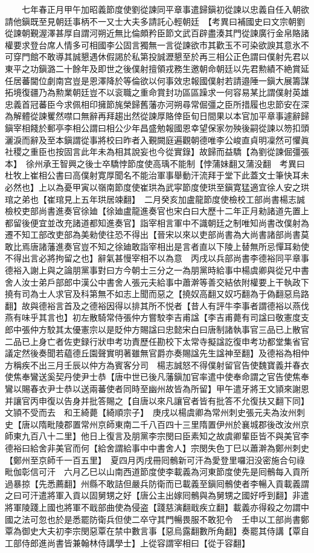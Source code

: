 　　七年春正月甲午加昭義節度使劉從諫同平章事遣歸鎭初從諫以忠義自任入朝欲請他鎭既至見朝廷事柄不一又士大夫多請託心輕朝廷　【考異曰補國史曰文宗朝劉從諫朝覲渥澤甚厚自謂河朔近無比倫頗矜臣節文武百辟盡湊其門從諫廣行金帛賂諸權要求登台席人情多可相國李公固言獨無一言從諫欲市其歡玉不可染欲諛其意氷不可穿門館不敢導其誠懇遇休假謁於私第投誠瀝懇至於再三相公正色謂曰僕射先君以東平之功鎭潞二十餘年及即世之後僕射擅領戎務生邀朝命朝廷以先君勲績不絶賞延任居蕃閫位劇南宫豈是恩澤降於等倫欲以何事效忠報國僕射若請邉陲一鎭大展籌謀拓境復疆乃為勲業朝廷豈不以衮職之重命賞封功區區躁求一何容易某比謂僕射英雄忠義首冠蕃臣今求佩相印擁節旄榮歸舊藩亦河朔尋常倔彊之臣所措履也忠節安在深為解體從諫矍然噤口無辭再拜趨出然從諫厚賂倖臣旬日間果以本官加平章事遽辭歸鎭宰相餞於郵亭李相公謂曰相公少年昌盛勉報國恩幸望保家勿殃後嗣從諫以笏扣頭灑淚而辭及至本鎭謂從事將校曰昨者入覲闕庭遍觀朝德唯李公峻直貞明凜然可懼眞社稷之重臣也按固言此年未為相其說妄也今從實錄】故歸而益驕【為劉從諫倔彊張本】　徐州承王智興之後士卒驕悖節度使高瑀不能制【悖蒲妹翻又蒲没翻　考異曰杜牧上崔相公書曰高僕射寛厚聞名不能治軍事舉動汗流拜于堂下此蓋文士筆快耳未必然也】上以為憂甲寅以嶺南節度使崔珙為武寜節度使珙至鎭寛猛適宜徐人安之珙琯之弟也【崔琯見上五年珙居竦翻】　二月癸亥加盧龍節度使檢校工部尚書楊志誠檢校吏部尚書進奏官徐廸【徐廸盧龍進奏官也宋白曰大歷十二年正月勑諸道先置上都留後便宜並改充諸道都知進奏官】詣宰相言軍中不識朝廷之制唯知尚書改僕射為遷不知工部改吏部為美勑使往恐不得出【晉宋以來以吏部尚書為大尚書諸部尚書莫敢比焉唐諸藩進奏官豈不知之徐廸敢詣宰相出是言者直以下陵上替無所忌憚耳勑使不得出言必將拘留之也】辭氣甚慢宰相不以為意　丙戌以兵部尚書李德裕同平章事德裕入謝上與之論朋黨事對曰方今朝士三分之一為朋黨時給事中楊虞卿與從兄中書舍人汝士弟戶部郎中漢公中書舍人張元夫給事中蕭澣等善交結依附權要上干執政下撓有司為士人求官及科第無不如志上聞而惡之【撓奴高翻又奴巧翻為于偽翻惡烏路翻】故與德裕言首及之德裕因得以排其所不悦者【昔人有評牛李事者謂德裕以燕伐燕有味乎其言也】初左散騎常侍張仲方嘗駮李吉甫諡【李吉甫薨有司諡曰敬憲度支郎中張仲方駮其太優憲宗以是貶仲方賜諡曰忠懿宋白曰唐制諸執事官三品已上散官二品已上身亡者佐吏録行狀申考功責歷任勘校下太常寺擬諡訖復申考功都堂集省官議定然後奏聞若藴德丘園聲實明著雖無官爵亦奏賜諡先生諡神至翻】及德裕為相仲方稱疾不出三月壬辰以仲方為賓客分司　楊志誠怒不得僕射留官告使魏寶義并春衣使焦奉鸞送奚契丹使尹士恭【唐中世已後凡藩鎭加官率遣中使奉命謂之官告使焦奉鸞以賜春衣尹士恭以送兩蕃使者同時至幽州故皆為所留】甲午遣牙將王文頴來謝恩并讓官丙申復以告身并批答賜之【自唐以來凡讓官者皆有批答不允復扶又翻下同】文頴不受而去　和王綺薨【綺順宗子】　庚戌以楊虞卿為常州刺史張元夫為汝州刺史【唐以隋毗陵郡置常州京師東南二千八百四十三里隋置伊州於襄城郡後改汝州京師東九百八十二里】他日上復言及朋黨李宗閔曰臣素知之故虞卿輩臣皆不與美官李德裕曰給舍非美官而何【給舍謂給事中中書舍人】宗閔失色丁巳以蕭澣為鄭州刺史【鄭州至京師千一百五里】　夏四月丙戌冊囘鶻新可汗為愛登里囉汨没密施合句祿毗伽彰信可汗　六月乙巳以山南西道節度使李載義為河東節度使先是囘鶻每入貢所過暴掠【先悉薦翻】州縣不敢詰但嚴兵防衛而已載義至鎭囘鶻使者李暢入貢載義謂之曰可汗遣將軍入貢以固舅甥之好【唐公主出嫁囘鶻與為舅甥之國好呼到翻】非遣將軍陵踐上國也將軍不戢部曲使為侵盗【踐慈演翻戢疾立翻】載義亦得殺之勿謂中國之法可忽也於是悉罷防衛兵但使二卒守其門暢畏服不敢犯令　壬申以工部尚書鄭覃為御史大夫初李宗閔惡覃在禁中數言事【惡烏露翻數所角翻】奏罷其侍講【覃自工部侍郎進尚書皆兼翰林侍講學士】上從容謂宰相曰【從于容翻】